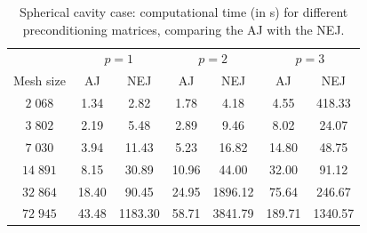 \documentclass[sn-mathphys,Numbered]{sn-jnl}%
\begin{document}
\begin{table}[h]
\centering
\begin{tabular}{ccccccc}
\multicolumn{1}{l}{} & \multicolumn{2}{c}{$p=1$} & \multicolumn{2}{c}{$p=2$} & \multicolumn{2}{c}{$p=3$} \\
Mesh size             & AJ          & NEJ           & AJ          & NEJ           & AJ          & NEJ        \\ \hline
$2\;068$                  & 1.34           & 2.82            & 1.78           & 4.18          & 4.55         &  418.33        \\
$3\;802$                 & 2.19           & 5.48            & 2.89           & 9.46         & 8.02      &  24.07             \\
$7\;030$                  & 3.94           & 11.43            & 5.23           & 16.82       & 14.80         &  48.75           \\
$14\;891$                  & 8.15           & 30.89            & 10.96           & 44.00        & 32.00    &   91.12              \\
$32\;864$                 & 18.40           & 90.45            & 24.95           & 1896.12         & 75.64  &   246.67                 \\
$72\;945$                 & 43.48          & 1183.30          & 58.71         & 3841.79        & 189.71 &  1340.57              \\ \hline
\end{tabular}
\caption{Spherical cavity case: computational time (in s) for different preconditioning matrices, comparing the AJ with the NEJ.}
\label{tab:AJvsTJ-SC}
\end{table}
%
%
%
%
\end{document}
